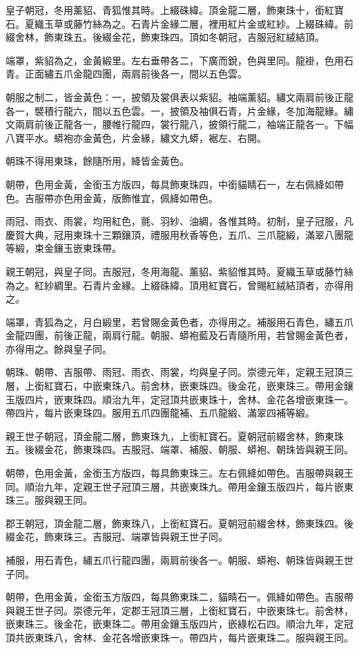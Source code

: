 \begin{pinyinscope}
皇子朝冠，冬用薰貂、青狐惟其時。上綴硃緯。頂金龍二層，飾東珠十，銜紅寶石。夏織玉草或藤竹絲為之。石青片金緣二層，裡用紅片金或紅紗。上綴硃緯。前綴舍林，飾東珠五。後綴金花，飾東珠四。頂如冬朝冠，吉服冠紅絨結頂。

端罩，紫貂為之，金黃緞里。左右垂帶各二，下廣而銳，色與里同。龍褂，色用石青。正面繡五爪金龍四團，兩肩前後各一，間以五色雲。

朝服之制二，皆金黃色：一，披領及裳俱表以紫貂。袖端薰貂。繡文兩肩前後正龍各一，襞積行龍六，間以五色雲。一，披領及袖俱石青，片金緣，冬加海龍緣。繡文兩肩前後正龍各一，腰帷行龍四，裳行龍八，披領行龍二，袖端正龍各一。下幅八寶平水。蟒袍亦金黃色，片金緣，繡文九蟒，裾左、右開。

朝珠不得用東珠，餘隨所用，絳皆金黃色。

朝帶，色用金黃，金銜玉方版四，每具飾東珠四，中銜貓睛石一，左右佩絳如帶色。吉服帶亦色用金黃，版飾惟宜，佩絳如帶色。

雨冠、雨衣、雨裳，均用紅色，氈、羽紗、油綢，各惟其時。初制，皇子冠服，凡慶賀大典，冠用東珠十三顆鑲頂，禮服用秋香等色，五爪、三爪龍緞，滿翠八團龍等緞，束金鑲玉嵌東珠帶。

親王朝冠，與皇子同。吉服冠，冬用海龍、薰貂、紫貂惟其時。夏織玉草或藤竹絲為之。紅紗綢里。石青片金緣。上綴硃緯。頂用紅寶石，曾賜紅絨結頂者，亦得用之。

端罩，青狐為之，月白緞里，若曾賜金黃色者，亦得用之。補服用石青色，繡五爪金龍四團，前後正龍，兩肩行龍。朝服、蟒袍藍及石青隨所用，若曾賜金黃色者，亦得用之。餘與皇子同。

朝珠、朝帶、吉服帶、雨冠、雨衣、雨裳，均與皇子同。崇德元年，定親王冠頂三層，上銜紅寶石，中嵌東珠八。前舍林，嵌東珠四。後金花，嵌東珠三。帶用金鑲玉版四片，嵌東珠四。順治九年，定冠頂共嵌東珠十，舍林、金花各增嵌東珠一。帶四片，每片嵌東珠四。服用五爪四團龍補、五爪龍緞、滿翠四補等緞。

親王世子朝冠，頂金龍二層，飾東珠九，上銜紅寶石。夏朝冠前綴舍林，飾東珠五。後綴金花，飾東珠四。吉服冠、端罩、補服、朝服、蟒袍、朝珠皆與親王同。

朝帶，色用金黃，金銜玉方版四，每具飾東珠三。左右佩絳如帶色。吉服帶與親王同。順治九年，定親王世子冠頂三層，共嵌東珠九。帶用金鑲玉版四片，每片嵌東珠三。服與親王同。

郡王朝冠，頂金龍二層，飾東珠八，上銜紅寶石。夏朝冠前綴舍林，飾東珠四。後綴金花，飾東珠三。吉服冠、端罩皆與親王世子同。

補服，用石青色，繡五爪行龍四團，兩肩前後各一。朝服、蟒袍、朝珠皆與親王世子同。

朝帶，色用金黃，金銜玉方版四，每具飾東珠二，貓睛石一。佩絳如帶色。吉服帶與親王世子同。崇德元年，定郡王冠頂三層，上銜紅寶石，中嵌東珠七。前舍林，嵌東珠三。後金花，嵌東珠二。帶用金鑲玉版四片，嵌綠松石四。順治九年，定冠頂共嵌東珠八，舍林、金花各增嵌東珠一。帶四片，每片嵌東珠二。服與親王同。


\end{pinyinscope}
